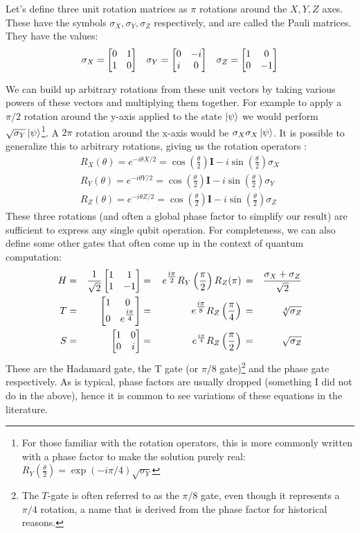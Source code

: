 Let's define three unit rotation matrices as $\pi$ rotations around the $X, Y, Z$ axes. These have the symbols
$\sigma_X, \sigma_Y, \sigma_Z$ respectively, and are called the Pauli matrices.
They have the values:
\begin{align}
  \sigma_X = \begin{bmatrix}0&1\\1&0\end{bmatrix} && \sigma_Y = \begin{bmatrix}0&-i\\i&0\end{bmatrix} && \sigma_Z = \begin{bmatrix}1&0\\0&-1\end{bmatrix}
  \label{eq:pauli}
\end{align}

We can build up arbitrary rotations from these unit vectors by taking various powers of these vectors
and multiplying them together. For example to apply a $\pi/2$ rotation around the y-axis applied to the state $\ket{\psi}$
we would perform $\sqrt{\sigma_Y}\ket{\psi}$\footnote{For those familiar with the rotation operators,
this is more commonly written with a phase factor to make the solution purely real: $R_Y(\tfrac{\theta}{2})
= \exp(-i\pi/4)\sqrt{\sigma_Y}$}.
A $2\pi$ rotation around the x-axis would be $\sigma_X\sigma_X\ket{\psi}$. It is possible to generalize this
to arbitrary rotations, giving us the rotation operators \cite{Nielsen:rot}:
\begin{align}
  R_X(\theta) = e^{-i \theta X/2} = \cos\left(\frac{\theta}{2}\right)\boldsymbol{I} - i \sin\left(\frac{\theta}{2}\right)\sigma_X \\
  R_Y(\theta) = e^{-i \theta Y/2} = \cos\left(\frac{\theta}{2}\right)\boldsymbol{I} - i \sin\left(\frac{\theta}{2}\right)\sigma_Y \\
  R_Z(\theta) = e^{-i \theta Z/2} = \cos\left(\frac{\theta}{2}\right)\boldsymbol{I} - i \sin\left(\frac{\theta}{2}\right)\sigma_Z
\end{align}
These three rotations (and often a global phase factor to simplify our result) are sufficient to express
any single qubit operation. For completeness, we can also define some other gates that often come up in
the context of quantum computation:
\begin{alignat}{4}
    H &=& \frac{1}{\sqrt{2}}\begin{bmatrix}1&1\\1&-1\end{bmatrix} &=& \, e^{\tfrac{i\pi}{2}} R_Y\left(\frac{\pi}{2}\right) R_Z(\pi) \, &=& \frac{\sigma_X+\sigma_Z}{\sqrt{2}} \\
    T &=& \begin{bmatrix}1&0\\0&e^{\tfrac{i\pi}{4}}\end{bmatrix}  &=& \, e^{\tfrac{i\pi}{8}} R_Z\left(\frac{\pi}{4}\right)          \, &=& \sqrt[4]{\sigma_Z} \\
    S &=& \begin{bmatrix}1&0\\0&i\end{bmatrix}                    &=& \, e^{\frac{i \pi}{4}} R_Z\left(\frac{\pi}{2}\right)          \, &=& \sqrt{\sigma_Z}
\end{alignat}
These are the Hadamard gate, the T gate (or $\pi/8$ gate)\footnote{The $T$-gate is often
referred to as the $\pi/8$ gate, even though it represents a $\pi/4$ rotation, a name that is derived from
the phase factor for historical reasons.} and the phase gate respectively.
As is typical, phase factors are usually dropped (something I did not do in the above), hence it is
common to see variations of these equations in the literature.

